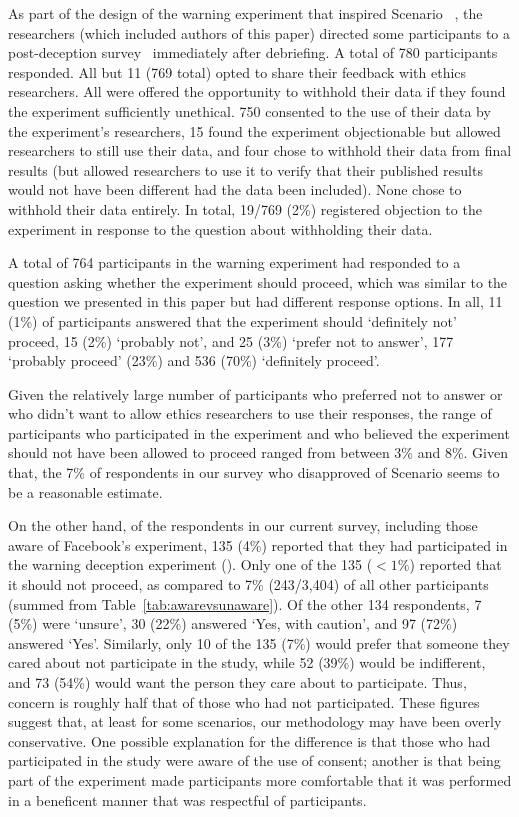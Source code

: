 As part of the design of the warning experiment that inspired Scenario \TreatmentNumWD{}~\cite{BravoLillo2013:Attention}, the researchers (which included authors of this paper) directed some participants to a post-deception survey~\cite{EthicalResearchProject} immediately after debriefing.  A total of 780 participants responded.  All but 11 (769 total) opted to share their feedback with ethics researchers.  All were offered the opportunity to withhold their data if they found the experiment sufficiently unethical.  750 consented to the use of their data by the experiment's researchers, 15 found the experiment objectionable but allowed researchers to still use their data, and four chose to withhold their data from final results (but allowed researchers to use it to verify that their published results would not have been different had the data been included).  None chose to withhold their data entirely.  In total, 19/769 (2\%) registered objection to the experiment in response to the question about withholding their data.

A total of 764 participants in the warning experiment had responded to a question asking whether the experiment should proceed, which was similar to the question we presented in this paper but had different response options.  In all, 11 (1\%) of participants answered that the experiment should `definitely not' proceed, 15 (2\%) `probably not', and 25 (3\%) `prefer not to answer', 177 `probably proceed' (23\%) and 536 (70\%) `definitely proceed'.

Given the relatively large number of participants who preferred not to answer or who didn't want to allow ethics researchers to use their responses, the range of participants who participated in the experiment and who believed the experiment should not have been allowed to proceed ranged from between 3\% and 8\%.  Given that, the 7\% of respondents in our survey who disapproved of Scenario \TreatmentNumWD{} seems to be a reasonable estimate.

On the other hand, of the  respondents in our current survey, including those aware of Facebook's experiment,  135 (4\%) reported that they had participated in the warning deception experiment ().  Only one of the 135 ($<1\%$) reported that it should not proceed, as compared to 7\% (243/3,404) of all other participants (summed from Table~\ref{tab:awarevsunaware}).  Of the other 134 respondents, 7 (5\%) were `unsure', 30 (22\%) answered `Yes, with caution', and 97 (72\%) answered `Yes'.
Similarly, only 10 of the 135 (7\%) would prefer that someone they cared about not participate in the study, while 52 (39\%) would be indifferent, and 73 (54\%) would want the person they care about to participate.  Thus, concern is roughly half that of those who had not participated.  These figures suggest that, at least for some scenarios, our methodology may have been overly conservative.  One possible explanation for the difference is that those who had participated in the study were aware of the use of consent; another is that being part of the experiment made participants more comfortable that it was performed in a beneficent manner that was respectful of participants.

